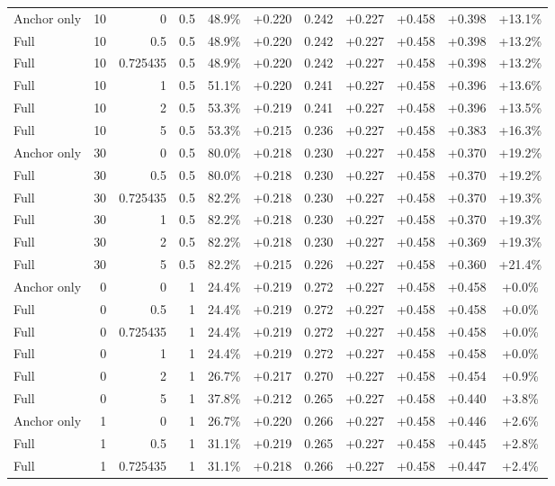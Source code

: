 \begin{table}[htbp]
\begin{tabular}{lrrrccccccc}
Anchor only & 10 & 0 & 0.5 & 48.9\% & +0.220 & 0.242 & +0.227 & +0.458 & +0.398 & +13.1\% \\
Full & 10 & 0.5 & 0.5 & 48.9\% & +0.220 & 0.242 & +0.227 & +0.458 & +0.398 & +13.2\% \\
Full & 10 & 0.725435 & 0.5 & 48.9\% & +0.220 & 0.242 & +0.227 & +0.458 & +0.398 & +13.2\% \\
Full & 10 & 1 & 0.5 & 51.1\% & +0.220 & 0.241 & +0.227 & +0.458 & +0.396 & +13.6\% \\
Full & 10 & 2 & 0.5 & 53.3\% & +0.219 & 0.241 & +0.227 & +0.458 & +0.396 & +13.5\% \\
Full & 10 & 5 & 0.5 & 53.3\% & +0.215 & 0.236 & +0.227 & +0.458 & +0.383 & +16.3\% \\
Anchor only & 30 & 0 & 0.5 & 80.0\% & +0.218 & 0.230 & +0.227 & +0.458 & +0.370 & +19.2\% \\
Full & 30 & 0.5 & 0.5 & 80.0\% & +0.218 & 0.230 & +0.227 & +0.458 & +0.370 & +19.2\% \\
Full & 30 & 0.725435 & 0.5 & 82.2\% & +0.218 & 0.230 & +0.227 & +0.458 & +0.370 & +19.3\% \\
Full & 30 & 1 & 0.5 & 82.2\% & +0.218 & 0.230 & +0.227 & +0.458 & +0.370 & +19.3\% \\
Full & 30 & 2 & 0.5 & 82.2\% & +0.218 & 0.230 & +0.227 & +0.458 & +0.369 & +19.3\% \\
Full & 30 & 5 & 0.5 & 82.2\% & +0.215 & 0.226 & +0.227 & +0.458 & +0.360 & +21.4\% \\
Anchor only & 0 & 0 & 1 & 24.4\% & +0.219 & 0.272 & +0.227 & +0.458 & +0.458 & +0.0\% \\
Full & 0 & 0.5 & 1 & 24.4\% & +0.219 & 0.272 & +0.227 & +0.458 & +0.458 & +0.0\% \\
Full & 0 & 0.725435 & 1 & 24.4\% & +0.219 & 0.272 & +0.227 & +0.458 & +0.458 & +0.0\% \\
Full & 0 & 1 & 1 & 24.4\% & +0.219 & 0.272 & +0.227 & +0.458 & +0.458 & +0.0\% \\
Full & 0 & 2 & 1 & 26.7\% & +0.217 & 0.270 & +0.227 & +0.458 & +0.454 & +0.9\% \\
Full & 0 & 5 & 1 & 37.8\% & +0.212 & 0.265 & +0.227 & +0.458 & +0.440 & +3.8\% \\
Anchor only & 1 & 0 & 1 & 26.7\% & +0.220 & 0.266 & +0.227 & +0.458 & +0.446 & +2.6\% \\
Full & 1 & 0.5 & 1 & 31.1\% & +0.219 & 0.265 & +0.227 & +0.458 & +0.445 & +2.8\% \\
Full & 1 & 0.725435 & 1 & 31.1\% & +0.218 & 0.266 & +0.227 & +0.458 & +0.447 & +2.4\% \\

\end{tabular}
\end{table}
